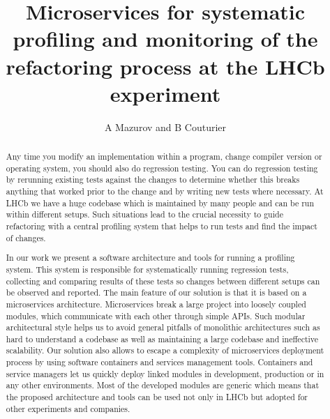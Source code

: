 \documentclass[a4paper]{jpconf}
\begin{document}
\title{Microservices for systematic profiling and monitoring of the refactoring process at the LHCb experiment}
\author{A Mazurov and B Couturier}
\thispagestyle{fancy}
\address{ University of Birmingham, Birmingham, United Kingdom}
\address{ CERN, European Organization for Nuclear Research, Geneva, Switzerland}




\newcommand\iamp{{Intel\textsuperscript{\textregistered} VTune\texttrademark Amplifier XE} }
\newcommand\amp{{VTune\texttrademark Amplifier XE} }
\newcommand\intel{{Intel\textsuperscript{\textregistered}} }
\newcommand\google{{Google\textsuperscript{\textregistered} }}
\newcommand\docker{\textit{Docker} }
\newcommand\compose{\textit{Compose} }
\newcommand\composes{\textit{Compose's} }

\begin{abstract}
Any time you modify an implementation within a program, change compiler version
or operating system, you should also do regression testing. You can do
regression testing by rerunning existing tests against the changes to determine
whether this breaks anything that worked prior to the change and by writing new
tests where necessary. At LHCb we have a huge codebase which is maintained by
many people and can be run within different setups. Such situations lead to the
crucial necessity to guide refactoring with a central profiling system that
helps to run tests and find the impact of changes.

In our work we present a software architecture and tools for running a profiling
system. This system is responsible for systematically running regression tests,
collecting and comparing results of these tests so changes between different
setups can be observed and reported. The main feature of our solution is that it
is based on a microservices architecture. Microservices break a large project
into loosely coupled modules, which communicate with each other through simple
APIs. Such modular architectural style helps us to avoid general pitfalls of
monolithic architectures such as hard to understand a codebase as well as
maintaining a large codebase and ineffective scalability. Our solution also
allows to escape a complexity of microservices deployment process by using
software containers and services management tools. Containers and service
managers let us quickly deploy linked modules in development, production or in
any other environments. Most of the developed modules are generic which means
that the proposed architecture and tools can be used not only in LHCb but
adopted for other experiments and companies. \end{abstract}
\end{document}
